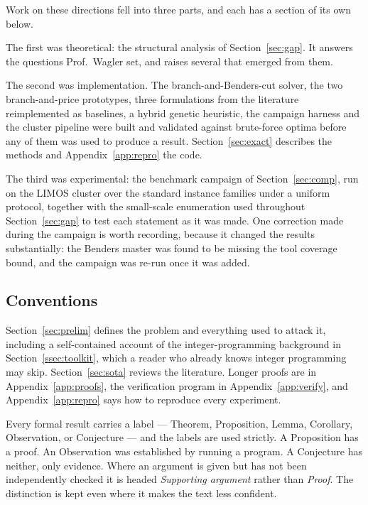 \noindent
Work on these directions fell into three parts, and each has a section of its own
below.

The first was theoretical: the structural analysis of Section~\ref{sec:gap}. It
answers the questions Prof.~Wagler set, and raises several that emerged from them.

The second was implementation. The branch-and-Benders-cut solver, the two
branch-and-price prototypes, three formulations from the literature reimplemented as
baselines, a hybrid genetic heuristic, the campaign harness and the cluster pipeline
were built and validated against brute-force optima before any of them was used to
produce a result. Section~\ref{sec:exact} describes the methods and
Appendix~\ref{app:repro} the code.

The third was experimental: the benchmark campaign of Section~\ref{sec:comp}, run on
the LIMOS cluster over the standard instance families under a uniform protocol,
together with the small-scale enumeration used throughout Section~\ref{sec:gap} to
test each statement as it was made. One correction made during the campaign is worth
recording, because it changed the results substantially: the Benders master was found
to be missing the tool coverage bound, and the campaign was re-run once it was added.

\subsection{Conventions}\label{ssec:intro-read}

Section~\ref{sec:prelim} defines the problem and everything used to attack it,
including a self-contained account of the integer-programming background in
Section~\ref{ssec:toolkit}, which a reader who already knows integer programming may
skip. Section~\ref{sec:sota} reviews the literature. Longer proofs are in
Appendix~\ref{app:proofs}, the verification program in Appendix~\ref{app:verify}, and
Appendix~\ref{app:repro} says how to reproduce every experiment.

Every formal result carries a label --- Theorem, Proposition, Lemma, Corollary,
Observation, or Conjecture --- and the labels are used strictly. A Proposition has a
proof. An Observation was established by running a program. A Conjecture has neither,
only evidence. Where an argument is given but has not been independently checked it is
headed \emph{Supporting argument} rather than \emph{Proof}. The distinction is kept
even where it makes the text less confident.
